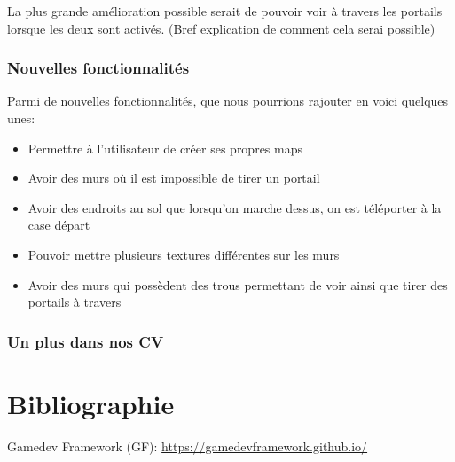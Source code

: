 \documentclass[12pt]{report}
\begin{document}
La plus grande amélioration possible serait de pouvoir voir à travers les portails
lorsque les deux sont activés. (Bref explication de comment cela serai possible)

\subsubsection{Nouvelles fonctionnalités}

Parmi de nouvelles fonctionnalités, que nous pourrions rajouter en voici quelques unes:
\begin{itemize}
	\item Permettre à l'utilisateur de créer ses propres maps
	\item Avoir des murs où il est impossible de tirer un portail
	\item Avoir des endroits au sol que lorsqu'on marche dessus, on est téléporter à la case départ
	\item Pouvoir mettre plusieurs textures différentes sur les murs
	\item Avoir des murs qui possèdent des trous permettant de voir ainsi que tirer des portails à travers
\end{itemize}

\subsubsection{Un plus dans nos CV}

\section{Bibliographie}

Gamedev Framework (GF): \href{https://gamedevframework.github.io/}{https://gamedevframework.github.io/}
\end{document}
